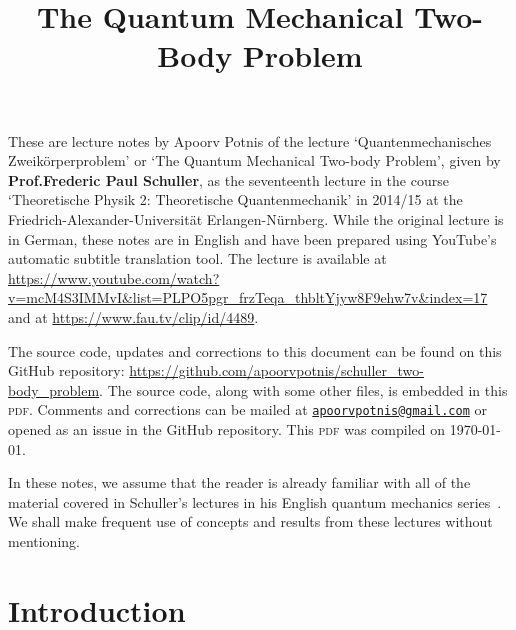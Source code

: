 \documentclass[12pt, a4 paper]{article}
\title{The Quantum Mechanical Two-Body Problem}
\author{}
\date{\vspace{-5ex}}
\theoremstyle{definition}
\begin{document}
    \maketitle

    These are lecture notes by Apoorv Potnis of the lecture `Quantenmechanisches Zweikörperproblem' or `The Quantum Mechanical Two-body Problem', given by \textbf{Prof.\@ Frederic Paul Schuller}, as the seventeenth lecture in the course `Theoretische Physik 2: Theoretische Quantenmechanik' in 2014/15 at the Friedrich-Alexander-Universität Erlangen-Nürnberg. While the original lecture is in German, these notes are in English and have been prepared using YouTube's automatic subtitle translation tool. The lecture is available at \url{https://www.youtube.com/watch?v=mcM4S3IMMvI&list=PLPO5pgr_frzTeqa_thbltYjyw8F9ehw7v&index=17} and at \url{https://www.fau.tv/clip/id/4489}.

    The source code, updates and corrections to this document can be found on this GitHub repository: \url{https://github.com/apoorvpotnis/schuller_two-body_problem}. The source code, along with some other files, is embedded in this \textsc{pdf}. Comments and corrections can be mailed at \href{mailto:apoorvpotnis@gmail.com}{\texttt{apoorvpotnis@gmail.com}} or opened as an issue in the GitHub repository. This \textsc{pdf} was compiled on \today.

    In these notes, we assume that the reader is already familiar with all of the material covered in Schuller's lectures in his English quantum mechanics series~\cite{SchullerVideos, Schuller}. We shall make frequent use of concepts and results from these lectures without mentioning.

    \tableofcontents

    \section{Introduction}
\end{document}
